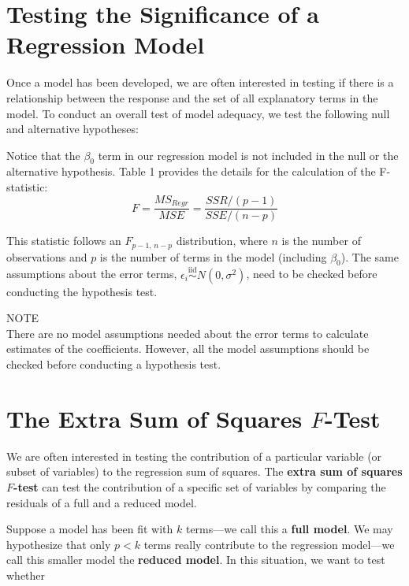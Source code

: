 \documentclass[
]{report}
\begin{document}
\section*{Testing the Significance of a Regression Model}\label{testing-the-significance-of-a-regression-model}

Once a model has been developed, we are often interested in testing if there is a relationship between the response and the set of all explanatory terms in the model. To conduct an overall test of model adequacy, we test the following null and alternative hypotheses:

Notice that the \(\beta_0\) term in our regression model is not included in the null or the alternative hypothesis. Table 1 provides the details for the calculation of the F-statistic:
\begin{equation}
F = \frac{MS_{Regr}}{MSE}
  = \frac{SSR/(p - 1)}{SSE/(n - p)}
\tag{3.11}
\end{equation}

This statistic follows an \(F_{p-1,\,n-p}\) distribution, where \(n\) is the number of observations and \(p\) is the number of terms in the model (including \(\beta_0\)). The same assumptions about the error terms, \(\epsilon_i \overset{\mathrm{iid}}{\sim}N(0,\sigma^2)\), need to be checked before conducting the hypothesis test.

NOTE\\
There are no model assumptions needed about the error terms to calculate estimates of the coefficients. However, all the model assumptions should be checked before conducting a hypothesis test.

\section*{\texorpdfstring{The Extra Sum of Squares \(F\)-Test}{The Extra Sum of Squares F-Test}}\label{the-extra-sum-of-squares-f-test}

We are often interested in testing the contribution of a particular variable (or subset of variables) to the regression sum of squares. The \textbf{extra sum of squares \(F\)-test} can test the contribution of a specific set of variables by comparing the residuals of a full and a reduced model.

Suppose a model has been fit with \(k\) terms---we call this a \textbf{full model}. We may hypothesize that only \(p < k\) terms really contribute to the regression model---we call this smaller model the \textbf{reduced model}. In this situation, we want to test whether
\end{document}
